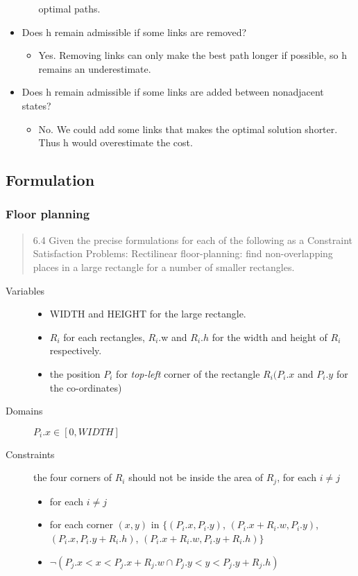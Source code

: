 \begin{itemize}
\begin{itemize}
    optimal paths.
  \end{itemize}
\item Does h remain admissible if some links are removed?
  \begin{itemize}
  \item Yes. Removing links can only make the best path longer if
    possible, so h remains an underestimate.
  \end{itemize}
\item Does h remain admissible if some links are added between
  nonadjacent states?
  \begin{itemize}
  \item No. We could add some links that makes the optimal solution
    shorter.  Thus h would overestimate the cost.
  \end{itemize}
\end{itemize}


\subsection{Formulation}
\subsubsection{Floor planning}
\begin{quote}
6.4 Given the precise formulations for each of the following as a Constraint Satisfaction Problems:
Rectilinear floor-planning: find non-overlapping places in a large rectangle for a number of smaller rectangles.
\end{quote}

\begin{description}
\item [Variables]
  \begin{itemize}
  \item WIDTH and HEIGHT for the large rectangle.
  \item $R_i$ for each rectangles, $R_{i}$.w and $R_{i}.h$ for the width and height of $R_i$ respectively.
  \item the position $P_i$ for \textit{top-left} corner of the rectangle $R_i (P_{i}.x$ and $P_{i}.y$ for the co-ordinates)
  \end{itemize}
\item [Domains] ${P_{i}.x \in [0, WIDTH]}$
\item [Constraints] the four corners of $R_i$ should not be inside the
  area of $R_j$, for each $i \neq j$
  \begin{itemize}
  \item  for each $i \neq j$
  \item  for each corner $(x,y)$ in
    $\{(P_{i}.x, P_{i}.y)$, $(P_i.x + R_i.w, P_i.y)$, $(P_i.x, P_i.y + R_i.h)$, $(P_i.x+R_i.w, P_i.y + R_i.h)\}$
  \item  $\neg (P_{j}.x < x < P_{j}.x + R_{j}.w \cap P_{j}.y < y < P_{j}.y + R_{j}.h)$
  \end{itemize}
\end{description}

